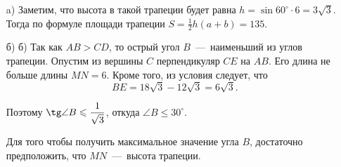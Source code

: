 \solutionSection
\begin{enumerate}
    \item[a)] Заметим, что высота в такой трапеции
        будет равна $h = \sin{60^\circ} \cdot 6 = 3\sqrt{3}$. Тогда по
        формуле площади трапеции $S = \frac{1}{2}h(a+b) = 135$.
        
    \item[б)]    б) Так как $AB > CD$, то острый угол $B$~---~наименьший из углов трапеции.
        Опустим из вершины $C$ перпендикуляр $CE$ на $AB$. Его длина не больше длины $MN = 6$.
        Кроме того, из условия следует, что 
        $$BE = 18\sqrt{3} - 12\sqrt{3} = 6\sqrt{3}.$$
        
        Поэтому $\tg\angle B \leqslant \dfrac{1}{\sqrt{3}}$, откуда $\angle B \leqslant 30^\circ$.	

        Для того чтобы получить максимальное значение угла $B$, достаточно предположить, что $MN$~---~высота трапеции.   
\end{enumerate}

